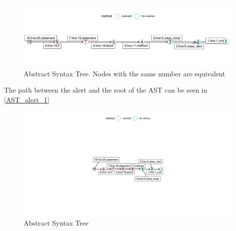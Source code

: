 \documentclass[
]{article}
\begin{document}



\begin{figure}[H]
\includegraphics[width=1\linewidth]{report_files/figure-latex/unnamed-chunk-4-1} \caption{Abstract Syntax Tree. Nodes with the same number are equivalent \label{AST_with_alerts}}\label{fig:unnamed-chunk-4}
\end{figure}

%
%



The path between the alert and the root of the AST can be seen in
\ref{AST_alert_1}

%
%


\begin{figure}[H]
\includegraphics[width=1\linewidth]{report_files/figure-latex/unnamed-chunk-5-1} \caption{Abstract Syntax Tree \label{AST_alert_1}}\label{fig:unnamed-chunk-5}
\end{figure}
\end{document}
